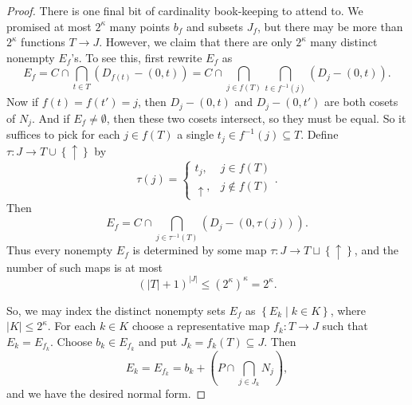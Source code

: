 \documentclass[10pt,a4paper]{amsart}
\newcommand{\set}[1]{\left\{#1\right\}}
\begin{document}
\begin{proof}
    There is one final bit of cardinality book-keeping to attend to. 
    We promised at most $2^\kappa$ many points $b_f$ and subsets $J_f$, but there may be more than $2^\kappa$ functions $T \to J$. However, we claim that there are only $2^\kappa$ many distinct nonempty $E_f$'s. 
    To see this, first rewrite $E_f$ as
    \[ 
        E_f = C \cap \bigcap_{t \in T} (D_{f(t)} - (0,t)) = C \cap \bigcap_{j \in f(T)} \bigcap_{t \in f^{-1}(j)} (D_j - (0,t)).
    \]
    Now if $f(t) = f(t') = j$, then $D_j - (0,t)$ and $D_j - (0,t')$ are both cosets of $N_j$.
    And if $E_f \neq \emptyset$, then these two cosets intersect, so they must be equal.
    So it suffices to pick for each $j \in f(T)$ a single $t_j \in f^{-1}(j) \subseteq T$. Define $\tau: J \to T \cup \set{\uparrow}$ by 
    \[
        \tau(j) = \begin{cases}
            t_j, & j \in f(T) \\
            \uparrow, & j \not \in f(T)
        \end{cases}.
    \]
    Then
    \[ 
        E_f = C \cap \bigcap_{j \in \tau^{-1}(T)} (D_j - (0,\tau(j))). 
    \]
    Thus every nonempty $E_f$ is determined by some map $\tau: J \to T \sqcup \set{\uparrow}$, and the number of such maps is at most 
    \[ (|T| + 1)^{|J|} \leq (2^\kappa)^\kappa = 2^\kappa. \]
    
    So, we may index the distinct nonempty sets $E_f$ as $\set{E_k \mid k \in K}$, where $|K| \leq 2^\kappa$. For each $k \in K$ choose a representative map $f_k: T \to J$ such that $E_k = E_{f_k}$. Choose $b_k \in E_{f_k}$ and put $J_k = f_k(T) \subseteq J$. Then 
    \[ 
        E_k = E_{f_k} = b_k + \left( P \cap \bigcap_{j \in J_k} N_j \right),
    \]
    and we have the desired normal form.
\end{proof}
\end{document}
